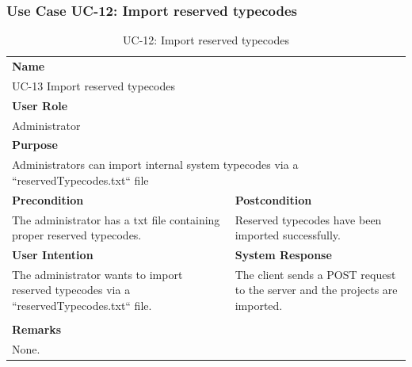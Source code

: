 \subsubsection{Use Case UC-12: Import reserved typecodes}\label{subsubsec:use-case-uc-12:-import-reserved-typecodes}

\begin{table}[H]
    \centering
    \begin{tabular}{|p{}|p{}|}

        \hline
        \multicolumn{2}{|l|}{\rowcolor{gray!50}\textbf{Name}} \\
        \multicolumn{2}{|l|}{UC-13 Import reserved typecodes} \\ \hline

        \multicolumn{2}{|l|}{\rowcolor{gray!50}\textbf{User Role}} \\
        \multicolumn{2}{|l|}{Administrator} \\ \hline

        \multicolumn{2}{|l|}{\rowcolor{gray!50}\textbf{Purpose}} \\
        \multicolumn{2}{|p{1\textwidth}|}{Administrators can import internal system typecodes via a ``reservedTypecodes.txt`` file} \\ \hline

        \rowcolor{gray!50}\textbf{Precondition} & \rowcolor{gray!50}\textbf{Postcondition} \\
        The administrator has a txt file containing proper reserved typecodes.
        &
        Reserved typecodes have been imported successfully.\\ \hline

        \rowcolor{gray!50}\textbf{User Intention} & \rowcolor{gray!50}\textbf{System Response} \\
        The administrator wants to import reserved typecodes via a ``reservedTypecodes.txt`` file.
        &
        The client sends a POST request to the server and the projects are imported. \\ \hline

        & \\ \hline

        \multicolumn{2}{|l|}{\rowcolor{gray!50}\textbf{Remarks}} \\
        \multicolumn{2}{|p{1\textwidth}|}{None.} \\ \hline
    \end{tabular}
    \caption{UC-12: Import reserved typecodes}
    \label{tab:uc-import-reserved-typecodes}
\end{table}

